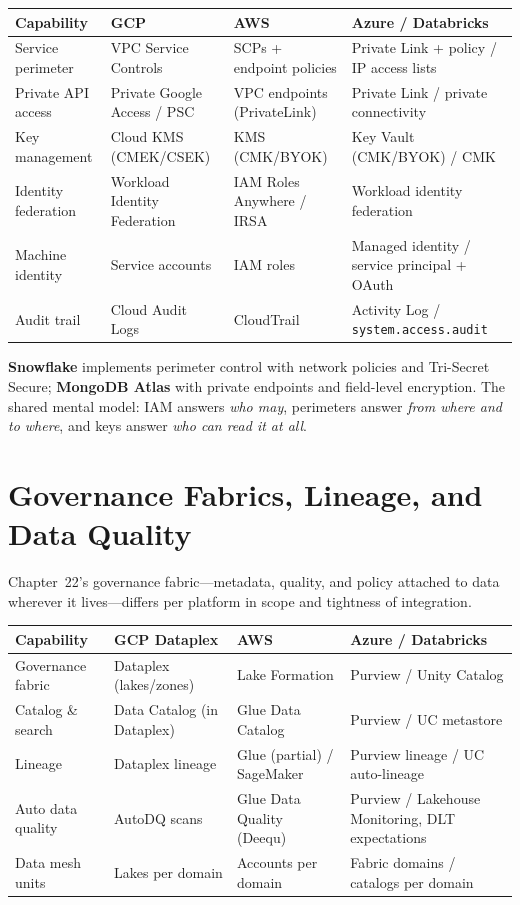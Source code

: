 \begin{center}
\footnotesize
\begin{tabular}{@{}p{2.8cm}p{3.0cm}p{3.0cm}p{3.4cm}@{}}
\toprule
\textbf{Capability} & \textbf{GCP} & \textbf{AWS} & \textbf{Azure / Databricks} \\
\midrule
Service perimeter & VPC Service Controls & SCPs + endpoint policies & Private Link + policy / IP access lists \\
Private API access & Private Google Access / PSC & VPC endpoints (PrivateLink) & Private Link / private connectivity \\
Key management & Cloud KMS (CMEK/CSEK) & KMS (CMK/BYOK) & Key Vault (CMK/BYOK) / CMK \\
Identity federation & Workload Identity Federation & IAM Roles Anywhere / IRSA & Workload identity federation \\
Machine identity & Service accounts & IAM roles & Managed identity / service principal + OAuth \\
Audit trail & Cloud Audit Logs & CloudTrail & Activity Log / \texttt{system.access.audit} \\
\bottomrule
\end{tabular}
\end{center}

\noindent \textbf{Snowflake} implements perimeter control with network policies and Tri-Secret
Secure; \textbf{MongoDB Atlas} with private endpoints and field-level encryption. The shared
mental model: IAM answers \emph{who may}, perimeters answer \emph{from where and to where}, and
keys answer \emph{who can read it at all}.

\section{Governance Fabrics, Lineage, and Data Quality}
%
Chapter~22's governance fabric---metadata, quality, and policy attached to data wherever it
lives---differs per platform in scope and tightness of integration.

\begin{center}
\footnotesize
\begin{tabular}{@{}p{2.8cm}p{3.0cm}p{3.0cm}p{3.4cm}@{}}
\toprule
\textbf{Capability} & \textbf{GCP Dataplex} & \textbf{AWS} & \textbf{Azure / Databricks} \\
\midrule
Governance fabric & Dataplex (lakes/zones) & Lake Formation & Purview / Unity Catalog \\
Catalog \& search & Data Catalog (in Dataplex) & Glue Data Catalog & Purview / UC metastore \\
Lineage & Dataplex lineage & Glue (partial) / SageMaker & Purview lineage / UC auto-lineage \\
Auto data quality & AutoDQ scans & Glue Data Quality (Deequ) & Purview / Lakehouse Monitoring, DLT expectations \\
Data mesh units & Lakes per domain & Accounts per domain & Fabric domains / catalogs per domain \\
\bottomrule
\end{tabular}
\end{center}

